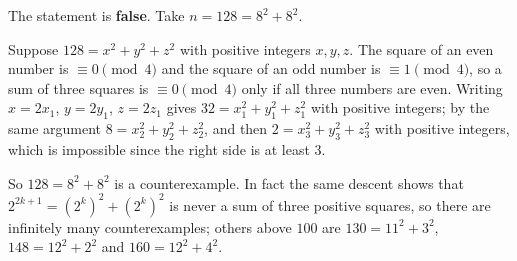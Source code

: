 The statement is \textbf{false}. Take $n=128=8^2+8^2$.

Suppose $128=x^2+y^2+z^2$ with positive integers $x,y,z$. The square of an even number is $\equiv0\pmod4$ and the square of an odd number is $\equiv1\pmod4$, so a sum of three squares is $\equiv0\pmod4$ only if all three numbers are even. Writing $x=2x_1$, $y=2y_1$, $z=2z_1$ gives $32=x_1^2+y_1^2+z_1^2$ with positive integers; by the same argument $8=x_2^2+y_2^2+z_2^2$, and then $2=x_3^2+y_3^2+z_3^2$ with positive integers, which is impossible since the right side is at least $3$.

So $\boxed{128=8^2+8^2}$ is a counterexample. In fact the same descent shows that $2^{2k+1}=\left(2^k\right)^2+\left(2^k\right)^2$ is never a sum of three positive squares, so there are infinitely many counterexamples; others above $100$ are $130=11^2+3^2$, $148=12^2+2^2$ and $160=12^2+4^2$.
